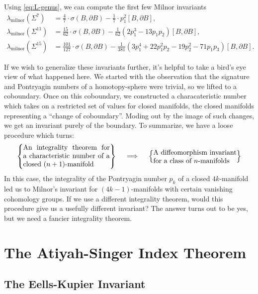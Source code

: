 \begin{example}
	Using \cref{eq:L-genus}, we can compute the first few Milnor invariants
	\[
		\begin{aligned}
			\lambda_{\mathrm{milnor}}(\Sigma^7)
			 & = \frac{4}{7}\cdot \sigma(B, \partial B) - \frac{1}{7}\cdot p_1^2[B, \partial B],
			 \\[0.5em]
			\lambda_{\mathrm{milnor}}(\Sigma^{11})
			 & = \frac{15}{62}\cdot \sigma(B,\partial B) - \frac{1}{62}\left(2p_1^3 - 13p_1p_2\right)[B,\partial B],
			 \\[0.5em]
			 \lambda_{\mathrm{milnor}}(\Sigma^{15})
			 &= \frac{101}{127}\cdot \sigma(B,\partial B) - \frac{1}{381}\left(3p_1^4 + 22p_1^2p_2 - 19p_2^2 - 71p_1p_3\right)[B,\partial B].
		\end{aligned}
	\]
\end{example}

If we wish to generalize these invariants further, it's helpful to take a bird's eye view of what happened here. We started with the observation that the signature and Pontryagin numbers of a homotopy-sphere were trivial, so we lifted to a coboundary. Once on this coboundary, we constructed a characateristic number which takes on a restricted set of values for closed manifolds, the closed manifolds representing a ``change of coboundary''. Moding out by the image of such changes, we get an invariant purely of the boundary. To summarize, we have a loose procedure which turns:
\[
	\left\{\parbox{12.5em}{An integrality theorem for a characteristic number of a closed $(n+1)$-manifold}\right\}
	\quad\implies \quad
	\left\{\parbox{12em}{A diffeomorphism invariant for a class of $n$-manifolds}\right\}
\]
In this case, the integrality of the Pontryagin number $p_k$ of a closed $4k$-manifold led us to Milnor's invariant for $(4k-1)$-manifolds with certain vanishing cohomology groups.
If we use a different integrality theorem, would this procedure give us a usefully different invariant? The answer turns out to be yes, but we need a fancier integrality theorem.


\section{The Atiyah-Singer Index Theorem}

\subsection{The Eells-Kupier Invariant}\label{sec:eells-kupier_invariant}

